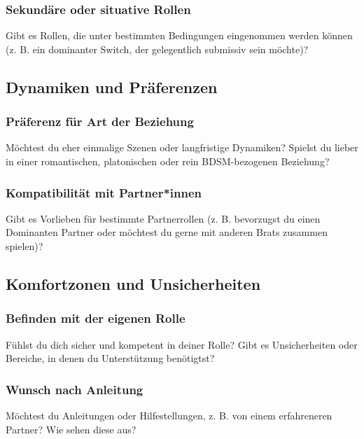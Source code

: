 \documentclass[a4paper,12pt]{article}
\begin{document}
\subsubsection{Sekundäre oder situative Rollen}
\noindent Gibt es Rollen, die unter bestimmten Bedingungen eingenommen werden können (z. B. ein dominanter Switch, der gelegentlich submissiv sein möchte)?\newline
\noindent \TextField[name=ErfahrungAndereRolle,multiline=true,height=7em, width=37em]{}

\subsection{Dynamiken und Präferenzen}
\subsubsection{Präferenz für Art der Beziehung}
\noindent Möchtest du eher einmalige Szenen oder langfristige Dynamiken? Spielst du lieber in einer romantischen, platonischen oder rein BDSM-bezogenen Beziehung?\newline
\noindent \TextField[name=PraefDynamik,multiline=true,height=7em, width=37em]{}

\subsubsection{Kompatibilität mit Partner*innen}
\noindent Gibt es Vorlieben für bestimmte Partnerrollen (z. B. bevorzugst du einen Dominanten Partner oder möchtest du gerne mit anderen Brats zusammen spielen)?\newline
\noindent \TextField[name=PraefKomp,multiline=true,height=7em, width=37em]{}

\subsection{Komfortzonen und Unsicherheiten}
\subsubsection{Befinden mit der eigenen Rolle}
\noindent Fühlst du dich sicher und kompetent in deiner Rolle? Gibt es Unsicherheiten oder Bereiche, in denen du Unterstützung benötigtst?\newline
\noindent \TextField[name=ComfUnRolle,multiline=true,height=7em, width=37em]{}

\subsubsection{Wunsch nach Anleitung}
\noindent Möchtest du Anleitungen oder Hilfestellungen, z. B. von einem erfahreneren Partner? Wie sehen diese aus? \newline
\noindent \TextField[name=ComfUnHilfe,multiline=true,height=7em, width=37em]{}
\end{document}
